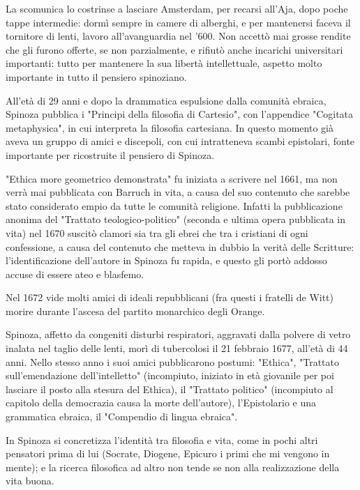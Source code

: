 La scomunica lo costrinse a lasciare Amsterdam, per recarsi all'Aja, dopo poche tappe intermedie: dormì sempre in camere di alberghi, e per mantenersi faceva il tornitore di lenti, lavoro all'avanguardia nel '600. Non accettò mai grosse rendite che gli furono offerte, se non parzialmente, e rifiutò anche incarichi universitari importanti: tutto per mantenere la sua libertà intellettuale, aspetto molto importante in tutto il pensiero spinoziano.

All'età di 29 anni e dopo la drammatica espulsione dalla comunità ebraica, Spinoza pubblica i "Principi della filosofia di Cartesio", con l'appendice "Cogitata metaphysica", in cui interpreta la filosofia cartesiana. In questo momento già aveva un gruppo di amici e discepoli, con cui intratteneva scambi epistolari, fonte importante per ricostruite il pensiero di Spinoza.

"Ethica more geometrico demonstrata" fu iniziata a scrivere nel 1661, ma non verrà mai pubblicata con Barruch in vita, a causa del suo contenuto che sarebbe stato considerato empio da tutte le comunità religione. Infatti la pubblicazione anonima del "Trattato teologico-politico" (seconda e ultima opera pubblicata in vita) nel 1670 suscitò clamori sia tra gli ebrei che tra i cristiani di ogni confessione, a causa del contenuto che metteva in dubbio la verità delle Scritture: l'identificazione dell'autore in Spinoza fu rapida, e questo gli portò addosso accuse di essere ateo e blasfemo.

Nel 1672 vide molti amici di ideali repubblicani (fra questi i fratelli de Witt) morire durante l'ascesa del partito monarchico degli Orange.

Spinoza, affetto da congeniti disturbi respiratori, aggravati dalla polvere di vetro inalata nel taglio delle lenti, morì di tubercolosi il 21 febbraio 1677, all'età di 44 anni. Nello stesso anno i suoi amici pubblicarono postumi: "Ethica", "Trattato sull'emendazione dell'intelletto" (incompiuto, iniziato in età giovanile per poi lasciare il posto alla stesura del Ethica), il "Trattato politico" (incompiuto al capitolo della democrazia causa la morte dell'autore), l'Epistolario e una grammatica ebraica, il "Compendio di lingua ebraica".

In Spinoza si concretizza l’identità tra filosofia e vita, come in pochi altri pensatori prima di lui (Socrate, Diogene, Epicuro i primi che mi vengono in mente); e la ricerca filosofica ad altro non tende se non alla realizzazione della vita buona.
\newpage